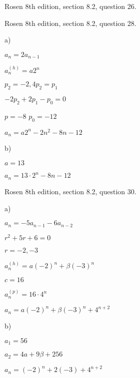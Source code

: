 

\newpage
\nextq Rosen 8th edition, section 8.2, question 26.

\SOLUTION



\newpage
\nextq Rosen 8th edition, section 8.2, question 28.

\SOLUTION

a)

$a_n = 2a_{n-1}$

$a_n^{(h)} = a2^n$

$p_2 = -2, 4p_2 = p_1$

$-2p_2 + 2p_1 - p_0 = 0$

$p = -8$ $p_0 = -12$

$a_n = a2^n -2n^2 -8n - 12$

b) 

$a=13$ 

$a_n = 13 \cdot 2^n - 8n - 12$


\newpage
\nextq Rosen 8th edition, section 8.2, question 30.

\SOLUTION

a)

$a_n = -5a_{n-1} - 6a_{n-2}$

$r^2 + 5r +6=0$ 

$r = -2,-3$

$a_n^{(h)} = a(-2)^n + \beta(-3)^n$

$c=16$

$a_n^{(p)} = 16 \cdot 4^n$

$a_n = a(-2)^n + \beta(-3)^n +4^{n+2}$

b)

$a_1 = 56$

$a_2 = 4a + 9 \beta + 256$

$a_n = (-2)^n + 2(-3) + 4^{n+2}$


\newpage


